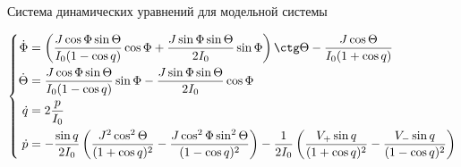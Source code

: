 \documentclass[hyperref={pdfpagelabels=false},usepdftitle=false, xcolor = dvipsnames]{beamer}
\begin{document}
\begin{frame}{Система динамических уравнений для модельной системы}
  \begin{varblock}[11cm]{}
  \vspace*{-0.5cm}
	\scriptsize \begin{gather}
\left\{
\begin{aligned}
\dot{\Phi} &= \left( \frac{J \cos \Phi \sin \Theta}{I_0 ( 1 - \cos q)} \cos \Phi + \frac{J \sin \Phi \sin \Theta}{2I_0} \sin \Phi \right) \ctg \Theta - \frac{J \cos \Theta}{I_0 (1 + \cos q)} \\
\dot{\Theta} &= \frac{J \cos \Phi \sin \Theta}{I_0 (1 - \cos q)} \sin \Phi - \frac{J \sin \Phi \sin \Theta}{2I_0} \cos \Phi \\
\dot{q} &= 2	\frac{p}{I_0} \\
\dot{p} &= - \frac{\sin q}{2I_0} \left( \frac{J^2 \cos^2 \Theta}{(1 + \cos q)^2} - \frac{J \cos^2 \Phi \sin^2 \Theta}{(1 - \cos q)^2} \right) - \frac{1}{2I_0} \left( \frac{V_{+} \sin q}{(1 + \cos q)^2} - \frac{V_{-} \sin q}{(1 - \cos q)^2} \right)
\end{aligned}
\right. \notag
	\end{gather}
  \end{varblock}
\end{frame}
\end{document}
